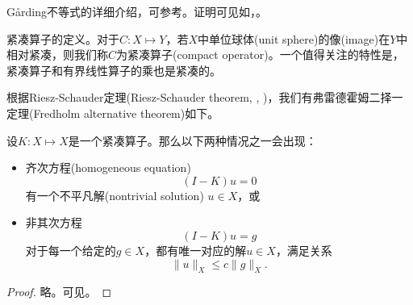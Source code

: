 Gårding不等式的详细介绍，可参考\cite[Theorem 2.4]{Jovanovic:2014iy}。证明可见如\cite[Theorem 8.1.1]{Agranovich:2015cv}，\cite[Therorem 9.17]{Renardy:2004tg}。

紧凑算子的定义。对于$C:X \mapsto Y$，若$X$中单位球体(unit sphere)的像(image)在$Y$中相对紧凑，则我们称$C$为紧凑算子(compact operator)。一个值得关注的特性是，紧凑算子和有界线性算子的乘也是紧凑的。

根据Riesz-Schauder定理(Riesz-Schauder theorem, \cite[Sec. X.5]{Yosida:1978ul}, \cite[Theorem 14.18]{Muscat:2014cc})，我们有弗雷德霍姆二择一定理(Fredholm alternative theorem)如下。
\begin{theorem}[弗雷德霍姆二择一定理]
\label{theorem:var-coercive-fredhold-alternative}
设$K:X \mapsto X$是一个紧凑算子。那么以下两种情况之一会出现：
\begin{itemize}
  \item 齐次方程(homogeneous equation)
  \begin{equation*}
    \left( I - K \right) u = 0
  \end{equation*}
  有一个不平凡解(nontrivial solution) $u \in X$，或
  \item 非其次方程
  \begin{equation*}
    \left( I - K \right) u = g
  \end{equation*}
  对于每一个给定的$g \in X$，都有唯一对应的解$u \in X$，满足关系
  \begin{equation*}
    \big\| u \big\|_{X} \le c \big\| g \big\|_{X}.
  \end{equation*}
\end{itemize}
\end{theorem}
\begin{proof}
  略。可见\cite[Sec. 18.1]{Agranovich:2015cv}。
\end{proof}

